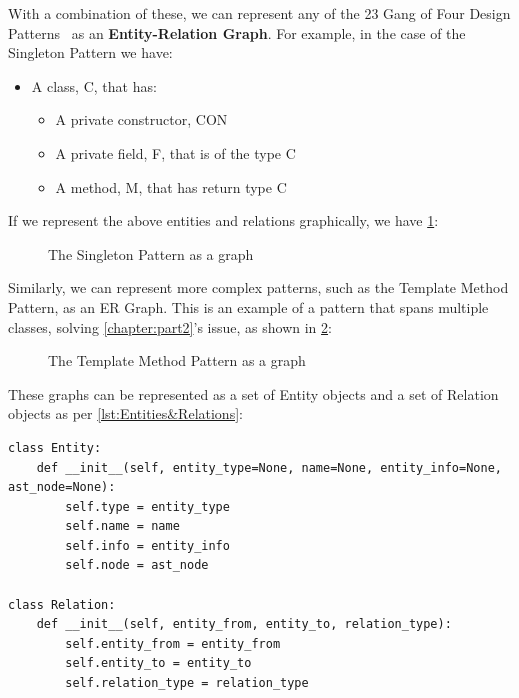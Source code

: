 With a combination of these, we can represent any of the 23 Gang of Four Design Patterns~\cite{GangOfFour} as an \textbf{Entity-Relation Graph}. For example, in the case of the Singleton Pattern we have:

\begin{itemize}
    \item A class, C, that has:
    \begin{itemize}
    \item A private constructor, CON
    \item A private field, F, that is of the type C
    \item A method, M, that has return type C
    \end{itemize}
\end{itemize}

If we represent the above entities and relations graphically, we have \cref{fig:Singleton Pattern}:

\begin{figure}[H]
    \centering
    
    \caption{The Singleton Pattern as a graph}
    \label{fig:Singleton Pattern}
\end{figure}

Similarly, we can represent more complex patterns, such as the Template Method Pattern, as an ER Graph. This is an example of a pattern that spans multiple classes, solving \cref{chapter:part2}'s issue, as shown in \cref{fig:TemplateMethodPatternGraph}:

\begin{figure}[H]
    \centering
    
    \caption{The Template Method Pattern as a graph}
    \label{fig:TemplateMethodPatternGraph}
\end{figure}

These graphs can be represented as a set of Entity objects and a set of Relation objects as per \cref{lst:Entities&Relations}:

\begin{listing}[H]
\begin{verbatim}
class Entity:
    def __init__(self, entity_type=None, name=None, entity_info=None, ast_node=None):
        self.type = entity_type
        self.name = name
        self.info = entity_info
        self.node = ast_node

class Relation:
    def __init__(self, entity_from, entity_to, relation_type):
        self.entity_from = entity_from
        self.entity_to = entity_to
        self.relation_type = relation_type
\end{verbatim}
\caption{Python classes representing Entities (Nodes) and Relations (Edges) within a graph}
\label{lst:Entities&Relations}
\end{listing}

